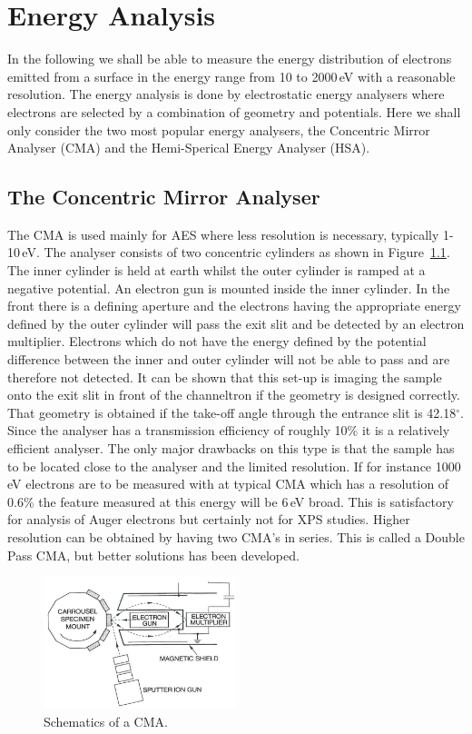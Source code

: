 \chapter{Energy Analysis}
In the following we shall be able to measure the energy distribution of electrons emitted from a surface in the energy range from 10 to 2000\,eV with a reasonable resolution. The energy analysis is done by electrostatic energy analysers where electrons are selected by a combination of geometry and potentials. Here we shall only consider the two most popular energy analysers, the Concentric Mirror Analyser (CMA) and the Hemi-Sperical Energy Analyser (HSA).

\section{The Concentric Mirror Analyser}
The CMA is used mainly for AES where less resolution is necessary, typically 1-10\,eV. The analyser consists of two concentric cylinders as shown in Figure~\ref{fig:schematics_cma}. The inner cylinder is held at earth whilst the outer cylinder is ramped at a negative potential. An electron gun is mounted inside the inner cylinder. In the front there is a defining aperture and the electrons having the appropriate energy defined by the outer cylinder will pass the exit slit and be detected by an electron multiplier. Electrons which do not have the energy defined by the potential difference between the inner and outer cylinder will not be able to pass and are therefore not detected. It can be shown that this set-up is imaging the sample onto the exit slit in front of the channeltron if the geometry is designed correctly. That geometry is obtained if the take-off angle through the entrance slit is 42.18$^{\circ}$. Since the analyser has a transmission efficiency of roughly 10\% it is a relatively efficient analyser. The only major drawbacks on this type is that the sample has to be located close to the analyser and the limited resolution. If for instance 1000 eV electrons are to be measured with at typical CMA which has a resolution of 0.6\% the feature measured at this energy will be 6\,eV broad. This is satisfactory for analysis of Auger electrons but certainly not for XPS studies. Higher resolution can be obtained by having two CMA's in series. This is called a Double Pass CMA, but better solutions has been developed.

\begin{figure}[htbp]
\centering
\includegraphics[width=0.5\textwidth]{figures/03_01}
\caption{Schematics of a CMA.}
\label{fig:schematics_cma}
\end{figure}

